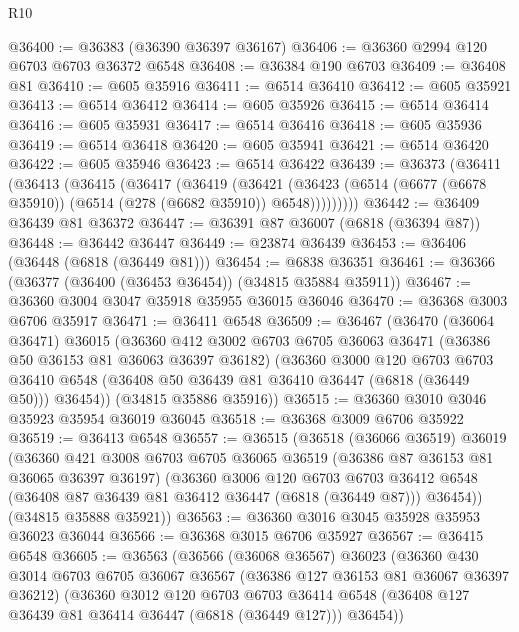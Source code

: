 \begin{lexlean}{R10}
\begin{coremodule}
@36400 := @36383 (@36390 @36397 @36167)
@36406 := @36360 @2994 @120 @6703 @6703 @36372 @6548
@36408 := @36384 @190 @6703
@36409 := @36408 @81
@36410 := @605 @35916
@36411 := @6514 @36410
@36412 := @605 @35921
@36413 := @6514 @36412
@36414 := @605 @35926
@36415 := @6514 @36414
@36416 := @605 @35931
@36417 := @6514 @36416
@36418 := @605 @35936
@36419 := @6514 @36418
@36420 := @605 @35941
@36421 := @6514 @36420
@36422 := @605 @35946
@36423 := @6514 @36422
@36439 := @36373
    (@36411
      (@36413
        (@36415
          (@36417
            (@36419
              (@36421
                (@36423 (@6514 (@6677 (@6678 @35910)) (@6514 (@278 (@6682 @35910)) @6548)))))))))
@36442 := @36409 @36439 @81 @36372
@36447 := @36391 @87 @36007 (@6818 (@36394 @87))
@36448 := @36442 @36447
@36449 := @23874 @36439
@36453 := @36406 (@36448 (@6818 (@36449 @81)))
@36454 := @6838 @36351
@36461 := @36366 (@36377 (@36400 (@36453 @36454)) (@34815 @35884 @35911))
@36467 := @36360 @3004 @3047 @35918 @35955 @36015 @36046
@36470 := @36368 @3003 @6706 @35917
@36471 := @36411 @6548
@36509 := @36467
    (@36470
      (@36064 @36471)
      @36015
      (@36360
        @412
        @3002
        @6703
        @6705
        @36063
        @36471
        (@36386 @50 @36153 @81 @36063 @36397 @36182)
        (@36360
          @3000
          @120
          @6703
          @6703
          @36410
          @6548
          (@36408 @50 @36439 @81 @36410 @36447 (@6818 (@36449 @50)))
          @36454))
      (@34815 @35886 @35916))
@36515 := @36360 @3010 @3046 @35923 @35954 @36019 @36045
@36518 := @36368 @3009 @6706 @35922
@36519 := @36413 @6548
@36557 := @36515
    (@36518
      (@36066 @36519)
      @36019
      (@36360
        @421
        @3008
        @6703
        @6705
        @36065
        @36519
        (@36386 @87 @36153 @81 @36065 @36397 @36197)
        (@36360
          @3006
          @120
          @6703
          @6703
          @36412
          @6548
          (@36408 @87 @36439 @81 @36412 @36447 (@6818 (@36449 @87)))
          @36454))
      (@34815 @35888 @35921))
@36563 := @36360 @3016 @3045 @35928 @35953 @36023 @36044
@36566 := @36368 @3015 @6706 @35927
@36567 := @36415 @6548
@36605 := @36563
    (@36566
      (@36068 @36567)
      @36023
      (@36360
        @430
        @3014
        @6703
        @6705
        @36067
        @36567
        (@36386 @127 @36153 @81 @36067 @36397 @36212)
        (@36360
          @3012
          @120
          @6703
          @6703
          @36414
          @6548
          (@36408 @127 @36439 @81 @36414 @36447 (@6818 (@36449 @127)))
          @36454))

\end{coremodule}
\end{lexlean}
